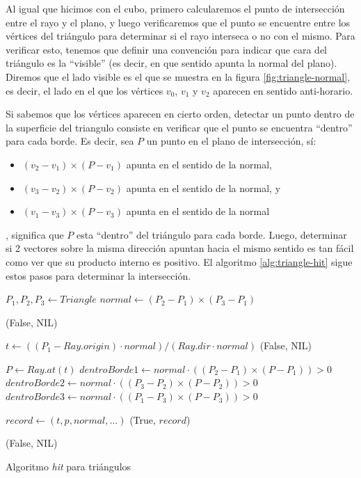 Al igual que hicimos con el cubo, primero calcularemos el punto de intersección
entre el rayo y el plano, y luego verificaremos que el punto se encuentre entre
los vértices del triángulo para determinar si el rayo interseca o no con el
mismo. Para verificar esto, tenemos que definir una convención para indicar que
cara del triángulo es la ``visible'' (es decir, en que sentido apunta la normal
del plano). Diremos que el lado visible es el que se muestra en la figura
\ref{fig:triangle-normal}, es decir, el lado en el que los vértices $v_0$, $v_1$
y $v_2$ aparecen en sentido anti-horario.

Si sabemos que los vértices aparecen en cierto orden, detectar un punto dentro
de la superficie del triangulo consiste en verificar que el punto se encuentra
``dentro'' para cada borde. Es decir, sea $P$ un punto en el plano de
intersección, sí:

\begin{itemize}
  \item $(v_2 - v_1) \times (P - v_1)$ apunta en el sentido de la normal,
  \item $(v_3 - v_2) \times (P - v_2)$ apunta en el sentido de la normal, y
  \item $(v_1 - v_3) \times (P - v_3)$ apunta en el sentido de la normal
\end{itemize}

, significa que $P$ esta ``dentro'' del triángulo para cada borde. Luego,
determinar si 2 vectores sobre la misma dirección apuntan hacia el mismo sentido
es tan fácil como ver que su producto interno es positivo. El algoritmo
\ref{alg:triangle-hit} sigue estos pasos para determinar la intersección.

\begin{algorithm}
  \begin{algorithmic}[1]
    \State $P_1, P_2, P_3 \gets Triangle$ 
    \State $normal \gets (P_2 - P_1) \times (P_3 - P_1)$

    \State \Return (False, NIL) 
    \EndIf

    \State $t \gets ((P_1 - Ray.origin) \cdot normal) / (Ray.dir \cdot normal)$
    \State \Return (False, NIL)
    \EndIf

    \State $P \gets Ray.at(t)$ 
    \State $dentroBorde1 \gets normal \cdot ((P_2 - P_1) \times (P - P_1)) > 0$
    \State $dentroBorde2 \gets normal \cdot ((P_3 - P_2) \times (P - P_2)) > 0$
    \State $dentroBorde3 \gets normal \cdot ((P_1 - P_3) \times (P - P_3)) > 0$


    \State $record \gets (t, p, normal, \dots)$
    \State \Return (True, $record$)
    \EndIf

    \State \Return (False, NIL)
    \EndFunction
  \end{algorithmic}
  \caption{Algoritmo \textit{hit} para triángulos}
  \label{alg:triangle-hit}
\end{algorithm}

